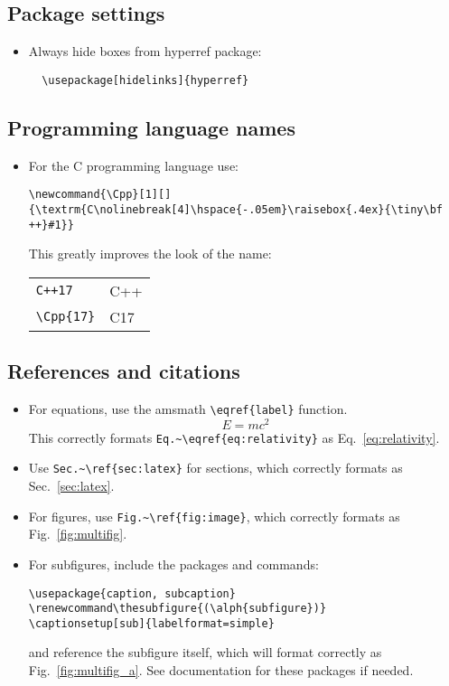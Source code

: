 \documentclass[10pt, letter]{article}
\renewcommand\thesubfigure{(\alph{subfigure})}
\newcommand{\Cpp}[1][]{\textrm{C\nolinebreak[4]\hspace{-.05em}\raisebox{.4ex}{\tiny\bf
      ++}#1}}
\begin{document}
\subsection{Package settings}
\begin{itemize}
\item Always hide boxes from hyperref package:
\begin{lstlisting}
  \usepackage[hidelinks]{hyperref}
\end{lstlisting}
\end{itemize}

\subsection{Programming language names}
\begin{itemize}
\item For the \Cpp{} programming language use:
\begin{lstlisting}
\newcommand{\Cpp}[1][]{\textrm{C\nolinebreak[4]\hspace{-.05em}\raisebox{.4ex}{\tiny\bf ++}#1}}
\end{lstlisting}
  This greatly improves the look of the name:
      \begin{center}
    \begin{tabular}[h!]{ll} 
      \verb|C++17| & C++ \\
      \verb|\Cpp{17}| & \Cpp{17}
    \end{tabular}
  \end{center}
\end{itemize}

\subsection{References and citations}

\begin{itemize}
\item For equations, use the amsmath \verb|\eqref{label}| function.
  \begin{equation}\label{eq:relativity}
    E = mc^2
  \end{equation}
  This correctly formats \verb|Eq.~\eqref{eq:relativity}| as
  Eq.~\eqref{eq:relativity}.
\item Use \verb|Sec.~\ref{sec:latex}| for sections, which correctly
  formats as Sec.~\ref{sec:latex}.
\item For figures, use \verb|Fig.~\ref{fig:image}|, which correctly
  formats as Fig.~\ref{fig:multifig}.
\item For subfigures, include the packages and commands:
\begin{lstlisting}
\usepackage{caption, subcaption}
\renewcommand\thesubfigure{(\alph{subfigure})}
\captionsetup[sub]{labelformat=simple}
\end{lstlisting}
and reference the subfigure itself,
which will format correctly as Fig.~\ref{fig:multifig_a}. See
documentation for these packages if needed.
\end{itemize}
\end{document}
